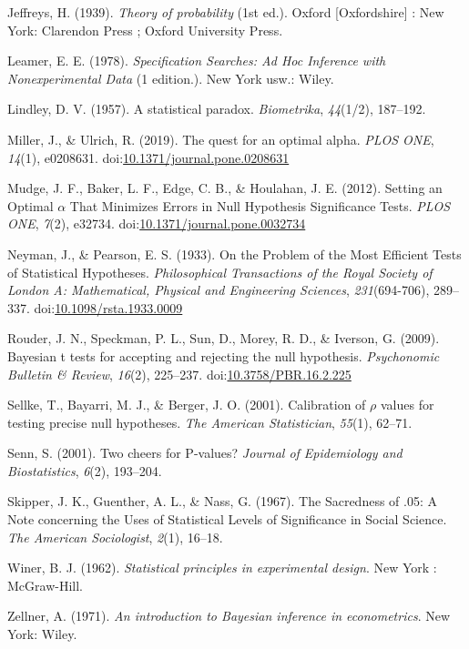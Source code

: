 \documentclass[,jou,floatsintext]{apa6}
\begin{document}
\leavevmode\hypertarget{ref-jeffreys_theory_1939}{}%
Jeffreys, H. (1939). \emph{Theory of probability} (1st ed.). Oxford {[}Oxfordshire{]} : New York: Clarendon Press ; Oxford University Press.

\leavevmode\hypertarget{ref-leamer_specification_1978}{}%
Leamer, E. E. (1978). \emph{Specification Searches: Ad Hoc Inference with Nonexperimental Data} (1 edition.). New York usw.: Wiley.

\leavevmode\hypertarget{ref-lindley_statistical_1957}{}%
Lindley, D. V. (1957). A statistical paradox. \emph{Biometrika}, \emph{44}(1/2), 187--192.

\leavevmode\hypertarget{ref-miller_quest_2019}{}%
Miller, J., \& Ulrich, R. (2019). The quest for an optimal alpha. \emph{PLOS ONE}, \emph{14}(1), e0208631. doi:\href{https://doi.org/10.1371/journal.pone.0208631}{10.1371/journal.pone.0208631}

\leavevmode\hypertarget{ref-mudge_setting_2012}{}%
Mudge, J. F., Baker, L. F., Edge, C. B., \& Houlahan, J. E. (2012). Setting an Optimal \(\alpha\) That Minimizes Errors in Null Hypothesis Significance Tests. \emph{PLOS ONE}, \emph{7}(2), e32734. doi:\href{https://doi.org/10.1371/journal.pone.0032734}{10.1371/journal.pone.0032734}

\leavevmode\hypertarget{ref-neyman_problem_1933}{}%
Neyman, J., \& Pearson, E. S. (1933). On the Problem of the Most Efficient Tests of Statistical Hypotheses. \emph{Philosophical Transactions of the Royal Society of London A: Mathematical, Physical and Engineering Sciences}, \emph{231}(694-706), 289--337. doi:\href{https://doi.org/10.1098/rsta.1933.0009}{10.1098/rsta.1933.0009}

\leavevmode\hypertarget{ref-rouder_bayesian_2009}{}%
Rouder, J. N., Speckman, P. L., Sun, D., Morey, R. D., \& Iverson, G. (2009). Bayesian t tests for accepting and rejecting the null hypothesis. \emph{Psychonomic Bulletin \& Review}, \emph{16}(2), 225--237. doi:\href{https://doi.org/10.3758/PBR.16.2.225}{10.3758/PBR.16.2.225}

\leavevmode\hypertarget{ref-sellke_calibration_2001}{}%
Sellke, T., Bayarri, M. J., \& Berger, J. O. (2001). Calibration of \(\rho\) values for testing precise null hypotheses. \emph{The American Statistician}, \emph{55}(1), 62--71.

\leavevmode\hypertarget{ref-senn_two_2001}{}%
Senn, S. (2001). Two cheers for P-values? \emph{Journal of Epidemiology and Biostatistics}, \emph{6}(2), 193--204.

\leavevmode\hypertarget{ref-skipper_sacredness_1967}{}%
Skipper, J. K., Guenther, A. L., \& Nass, G. (1967). The Sacredness of .05: A Note concerning the Uses of Statistical Levels of Significance in Social Science. \emph{The American Sociologist}, \emph{2}(1), 16--18.

\leavevmode\hypertarget{ref-winer_statistical_1962}{}%
Winer, B. J. (1962). \emph{Statistical principles in experimental design}. New York : McGraw-Hill.

\leavevmode\hypertarget{ref-zellner_introduction_1971}{}%
Zellner, A. (1971). \emph{An introduction to Bayesian inference in econometrics}. New York: Wiley.
\end{document}
